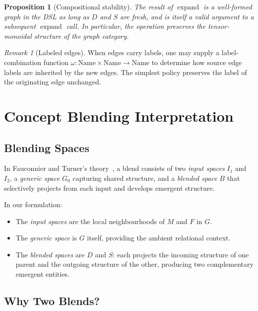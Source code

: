 \documentclass[11pt, a4paper]{article}
\theoremstyle{definition}
\theoremstyle{plain}
\newtheorem{proposition}{Proposition}[section]
\theoremstyle{remark}
\newtheorem{remark}{Remark}[section]
\newcommand{\expand}{\operatorname{expand}}
\begin{document}
\begin{proposition}[Compositional stability]
The result of $\expand$ is a well-formed graph in the DSL as long as $D$ and
$S$ are fresh, and is itself a valid argument to a subsequent $\expand$ call.
In particular, the operation preserves the tensor-monoidal structure of the
graph category.
\end{proposition}

\begin{remark}[Labeled edges]
When edges carry labels, one may supply a label-combination function
$\omega : \mathrm{Name} \times \mathrm{Name} \to \mathrm{Name}$ to determine
how source edge labels are inherited by the new edges.  The simplest policy
preserves the label of the originating edge unchanged.
\end{remark}

\section{Concept Blending Interpretation}
\label{sec:blending}

\subsection{Blending Spaces}

In Fauconnier and Turner's theory~\cite{fauconnier1998}, a blend consists of
two \emph{input spaces} $I_1$ and $I_2$, a \emph{generic space} $G_0$
capturing shared structure, and a \emph{blended space} $B$ that selectively
projects from each input and develops emergent structure.

In our formulation:
\begin{itemize}[leftmargin=2em]
  \item The \emph{input spaces} are the local neighbourhoods of $M$ and $F$
    in $G$.
  \item The \emph{generic space} is $G$ itself, providing the ambient
    relational context.
  \item The \emph{blended spaces} are $D$ and $S$: each projects the incoming
    structure of one parent and the outgoing structure of the other, producing
    two complementary emergent entities.
\end{itemize}

\subsection{Why Two Blends?}
\end{document}
